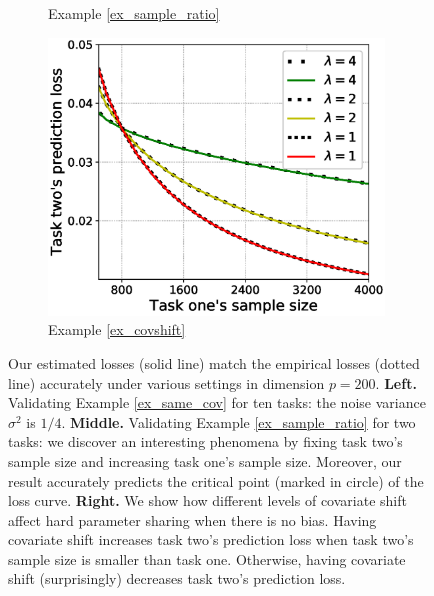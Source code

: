 {\begin{figure}[!t]
\begin{subfigure}[b]{0.33\textwidth}
		\caption{Example \ref{ex_sample_ratio}}
		\label{fig_size}
	\end{subfigure}\hfill
	\begin{subfigure}[b]{0.33\textwidth}
		\centering
		\includegraphics[width=0.98\textwidth]{figures/covariate_shift.eps}
		\caption{Example \ref{ex_covshift}}
		\label{fig_covariate}
	\end{subfigure}
	\caption{%
	Our estimated losses (solid line) match the empirical losses (dotted line) accurately under various settings in dimension $p = 200$.
	\textbf{Left.} Validating Example \ref{ex_same_cov} for ten tasks: the noise variance $\sigma^2$ is $1/4$.
	\textbf{Middle.} Validating Example \ref{ex_sample_ratio} for two tasks: we discover an interesting phenomena by fixing task two's sample size and increasing task one's sample size.
	Moreover, our result accurately predicts the critical point (marked in circle) of the loss curve.
	\textbf{Right.} We show how different levels of covariate shift affect hard parameter sharing when there is no bias.
	Having covariate shift increases task two's prediction loss when task two's sample size is smaller than task one. Otherwise, having covariate shift (surprisingly) decreases task two's prediction loss.}
	\label{fig_model_shift_phasetrans}
\end{figure}



}

